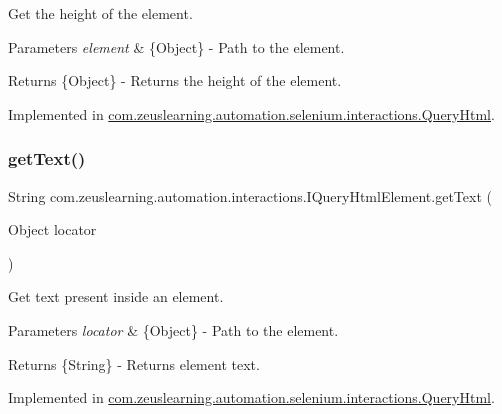 Get the height of the element.


\begin{DoxyParams}{Parameters}
{\em element} & \{Object\} -\/ Path to the element. \\
\hline
\end{DoxyParams}
\begin{DoxyReturn}{Returns}
\{Object\} -\/ Returns the height of the element. 
\end{DoxyReturn}


Implemented in \hyperlink{classcom_1_1zeuslearning_1_1automation_1_1selenium_1_1interactions_1_1QueryHtml_a768ebd5b4aac0a5de728e79a59ac9524}{com.\+zeuslearning.\+automation.\+selenium.\+interactions.\+Query\+Html}.

\hypertarget{interfacecom_1_1zeuslearning_1_1automation_1_1interactions_1_1IQueryHtmlElement_a246f2ac4d1610d263899d640db02f3ae}{}\label{interfacecom_1_1zeuslearning_1_1automation_1_1interactions_1_1IQueryHtmlElement_a246f2ac4d1610d263899d640db02f3ae} 
\subsubsection{\texorpdfstring{get\+Text()}{getText()}\hspace{0.1cm}{\footnotesize\ttfamily [1/2]}}
{\footnotesize\ttfamily String com.\+zeuslearning.\+automation.\+interactions.\+I\+Query\+Html\+Element.\+get\+Text (\begin{DoxyParamCaption}\item[{Object}]{locator }\end{DoxyParamCaption})}

Get text present inside an element.


\begin{DoxyParams}{Parameters}
{\em locator} & \{Object\} -\/ Path to the element. \\
\hline
\end{DoxyParams}
\begin{DoxyReturn}{Returns}
\{String\} -\/ Returns element text. 
\end{DoxyReturn}


Implemented in \hyperlink{classcom_1_1zeuslearning_1_1automation_1_1selenium_1_1interactions_1_1QueryHtml_a9635c7b4c91241fc2896d317ca4121ef}{com.\+zeuslearning.\+automation.\+selenium.\+interactions.\+Query\+Html}.

